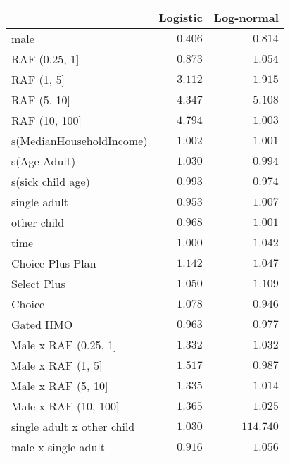 \begin{table}[!tbp]
\begin{center}
\begin{tabular}{lrr}
\hline\hline
\multicolumn{1}{l}{}&\multicolumn{1}{c}{Logistic}&\multicolumn{1}{c}{Log-normal}\tabularnewline
\hline
male&$0.406$&$  0.814$\tabularnewline
RAF (0.25, 1]&$0.873$&$  1.054$\tabularnewline
RAF (1, 5]&$3.112$&$  1.915$\tabularnewline
RAF (5, 10]&$4.347$&$  5.108$\tabularnewline
RAF (10, 100]&$4.794$&$  1.003$\tabularnewline
s(MedianHouseholdIncome)&$1.002$&$  1.001$\tabularnewline
s(Age Adult)&$1.030$&$  0.994$\tabularnewline
s(sick child age)&$0.993$&$  0.974$\tabularnewline
single adult&$0.953$&$  1.007$\tabularnewline
other child&$0.968$&$  1.001$\tabularnewline
time&$1.000$&$  1.042$\tabularnewline
Choice Plus Plan&$1.142$&$  1.047$\tabularnewline
Select Plus&$1.050$&$  1.109$\tabularnewline
Choice&$1.078$&$  0.946$\tabularnewline
Gated HMO&$0.963$&$  0.977$\tabularnewline
Male x RAF (0.25, 1]&$1.332$&$  1.032$\tabularnewline
Male x RAF (1, 5]&$1.517$&$  0.987$\tabularnewline
Male x RAF (5, 10]&$1.335$&$  1.014$\tabularnewline
Male x RAF (10, 100]&$1.365$&$  1.025$\tabularnewline
single adult x other child&$1.030$&$114.740$\tabularnewline
male x single adult&$0.916$&$  1.056$\tabularnewline
\hline
\end{tabular}\end{center}
\end{table}
